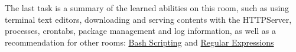 The last task is a summary of the learned abilities on this room, such as using terminal text editors, downloading and serving contents with the HTTPServer, processes, crontabs, package management and log information, as well as a recommendation for other rooms: \href{https://tryhackme.com/room/bashscripting}{Bash Scripting} and \href{https://tryhackme.com/room/catregex}{Regular Expressions}